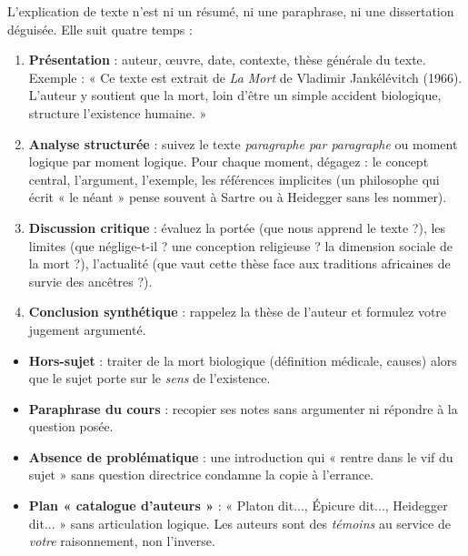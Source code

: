 \documentclass[11pt]{article}
\begin{document}
L'explication de texte n'est ni un résumé, ni une paraphrase, ni une dissertation déguisée. Elle suit quatre temps :

\begin{methode}
\begin{enumerate}
\item \textbf{Présentation} : auteur, œuvre, date, contexte, thèse générale du texte. Exemple : « Ce texte est extrait de \emph{La Mort} de Vladimir Jankélévitch (1966). L'auteur y soutient que la mort, loin d'être un simple accident biologique, structure l'existence humaine. »
\item \textbf{Analyse structurée} : suivez le texte \emph{paragraphe par paragraphe} ou moment logique par moment logique. Pour chaque moment, dégagez : le concept central, l'argument, l'exemple, les références implicites (un philosophe qui écrit « le néant » pense souvent à Sartre ou à Heidegger sans les nommer).
\item \textbf{Discussion critique} : évaluez la portée (que nous apprend le texte ?), les limites (que néglige-t-il ? une conception religieuse ? la dimension sociale de la mort ?), l'actualité (que vaut cette thèse face aux traditions africaines de survie des ancêtres ?).
\item \textbf{Conclusion synthétique} : rappelez la thèse de l'auteur et formulez votre jugement argumenté.
\end{enumerate}
\end{methode}

\begin{attention}
\begin{itemize}
\item \textbf{Hors-sujet} : traiter de la mort biologique (définition médicale, causes) alors que le sujet porte sur le \emph{sens} de l'existence.
\item \textbf{Paraphrase du cours} : recopier ses notes sans argumenter ni répondre à la question posée.
\item \textbf{Absence de problématique} : une introduction qui « rentre dans le vif du sujet » sans question directrice condamne la copie à l'errance.
\item \textbf{Plan « catalogue d'auteurs »} : « Platon dit..., Épicure dit..., Heidegger dit... » sans articulation logique. Les auteurs sont des \emph{témoins} au service de \emph{votre} raisonnement, non l'inverse.
\end{itemize}
\end{attention}
\end{document}
